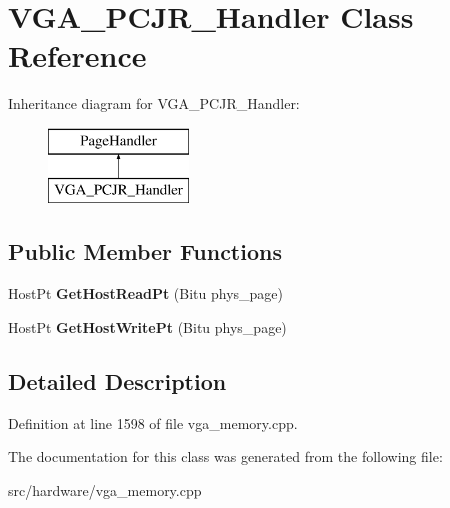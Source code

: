 \hypertarget{classVGA__PCJR__Handler}{\section{V\-G\-A\-\_\-\-P\-C\-J\-R\-\_\-\-Handler Class Reference}
\label{classVGA__PCJR__Handler}
}
Inheritance diagram for V\-G\-A\-\_\-\-P\-C\-J\-R\-\_\-\-Handler\-:\begin{figure}[H]
\begin{center}
\leavevmode
\includegraphics[height=2.000000cm]{classVGA__PCJR__Handler}
\end{center}
\end{figure}
\subsection*{Public Member Functions}
\begin{DoxyCompactItemize}
\item 
\hypertarget{classVGA__PCJR__Handler_a7af2542f4c4e96999dbda7fff177d521}{Host\-Pt {\bfseries Get\-Host\-Read\-Pt} (Bitu phys\-\_\-page)}\label{classVGA__PCJR__Handler_a7af2542f4c4e96999dbda7fff177d521}

\item 
\hypertarget{classVGA__PCJR__Handler_aed69d78cd3e5880a41aa82b1a99d93b3}{Host\-Pt {\bfseries Get\-Host\-Write\-Pt} (Bitu phys\-\_\-page)}\label{classVGA__PCJR__Handler_aed69d78cd3e5880a41aa82b1a99d93b3}

\end{DoxyCompactItemize}


\subsection{Detailed Description}


Definition at line 1598 of file vga\-\_\-memory.\-cpp.



The documentation for this class was generated from the following file\-:\begin{DoxyCompactItemize}
\item 
src/hardware/vga\-\_\-memory.\-cpp\end{DoxyCompactItemize}
